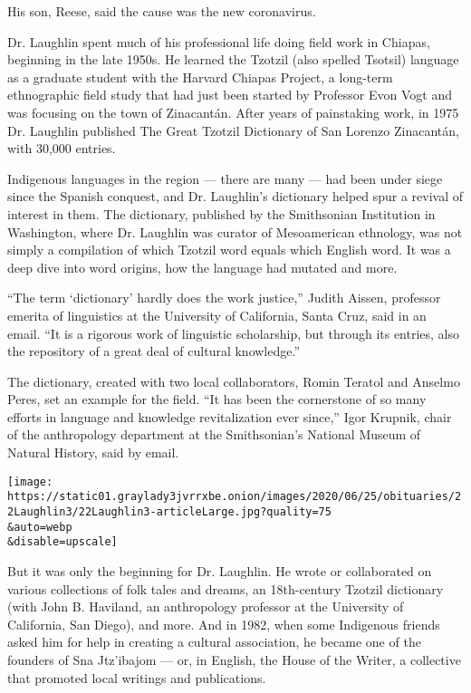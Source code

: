 His son, Reese, said the cause was the new coronavirus.

Dr. Laughlin spent much of his professional life doing field work in
Chiapas, beginning in the late 1950s. He learned the Tzotzil (also
spelled Tsotsil) language as a graduate student with the Harvard Chiapas
Project, a long-term ethnographic field study that had just been started
by Professor Evon Vogt and was focusing on the town of Zinacantán. After
years of painstaking work, in 1975 Dr. Laughlin published The Great
Tzotzil Dictionary of San Lorenzo Zinacantán, with 30,000 entries.

Indigenous languages in the region --- there are many --- had been under
siege since the Spanish conquest, and Dr. Laughlin's dictionary helped
spur a revival of interest in them. The dictionary, published by the
Smithsonian Institution in Washington, where Dr. Laughlin was curator of
Mesoamerican ethnology, was not simply a compilation of which Tzotzil
word equals which English word. It was a deep dive into word origins,
how the language had mutated and more.

``The term `dictionary' hardly does the work justice,'' Judith Aissen,
professor emerita of linguistics at the University of California, Santa
Cruz, said in an email. ``It is a rigorous work of linguistic
scholarship, but through its entries, also the repository of a great
deal of cultural knowledge.''

The dictionary, created with two local collaborators, Romin Teratol and
Anselmo Peres, set an example for the field. ``It has been the
cornerstone of so many efforts in language and knowledge revitalization
ever since,'' Igor Krupnik, chair of the anthropology department at the
Smithsonian's National Museum of Natural History, said by email.

\texttt{[image: https://static01.graylady3jvrrxbe.onion/images/2020/06/25/obituaries/22Laughlin3/22Laughlin3-articleLarge.jpg?quality=75\\\&auto=webp\\\&disable=upscale]}

But it was only the beginning for Dr. Laughlin. He wrote or collaborated
on various collections of folk tales and dreams, an 18th-century Tzotzil
dictionary (with John B. Haviland, an anthropology professor at the
University of California, San Diego), and more. And in 1982, when some
Indigenous friends asked him for help in creating a cultural
association, he became one of the founders of Sna Jtz'ibajom --- or, in
English, the House of the Writer, a collective that promoted local
writings and publications.

